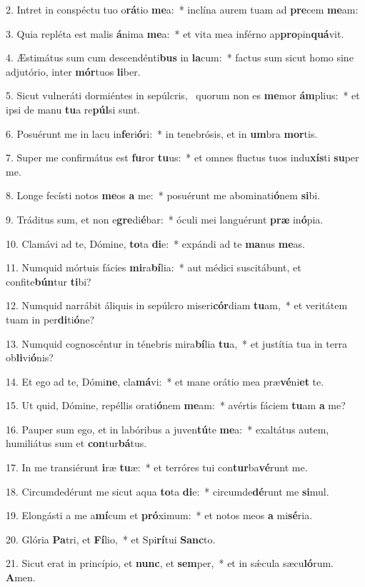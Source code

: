 2. Intret in conspéctu tuo o\textbf{rá}tio \textbf{me}a:~*  inclína aurem tuam ad \textbf{pre}cem \textbf{me}am:\

3. Quia repléta est malis \textbf{á}nima \textbf{me}a:~*  et vita mea inférno ap\textbf{pro}pin\textbf{quá}vit.\

4. Æstimátus sum cum descendénti\textbf{bus} in \textbf{la}cum:~*  factus sum sicut homo sine adjutório, inter \textbf{mór}tuos \textbf{li}ber.\

5. Sicut vulneráti dormiéntes in sepúlcris, \dag\  quorum non es \textbf{me}mor \textbf{ám}plius:~*  et ipsi de manu \textbf{tu}a re\textbf{púl}si sunt.\

6. Posuérunt me in lacu in\textbf{fe}ri\textbf{ó}ri:~*  in tenebrósis, et in \textbf{um}bra \textbf{mor}tis.\

7. Super me confirmátus est \textbf{fu}ror \textbf{tu}us:~*  et omnes fluctus tuos indu\textbf{xís}ti \textbf{su}per me.\

8. Longe fecísti notos \textbf{me}os \textbf{a} me:~*  posuérunt me abominati\textbf{ó}nem \textbf{si}bi.\

9. Tráditus sum, et non e\textbf{gre}di\textbf{é}bar:~*  óculi mei languérunt \textbf{præ} in\textbf{ó}pia.\

10. Clamávi ad te, Dómine, \textbf{to}ta \textbf{di}e:~*  expándi ad te \textbf{ma}nus \textbf{me}as.\

11. Numquid mórtuis fácies \textbf{mi}ra\textbf{bí}lia:~*  aut médici suscitábunt, et confite\textbf{bún}tur \textbf{ti}bi?\

12. Numquid narrábit áliquis in sepúlcro miseri\textbf{cór}diam \textbf{tu}am,~*  et veritátem tuam in per\textbf{di}ti\textbf{ó}ne?\

13. Numquid cognoscéntur in ténebris mira\textbf{bí}lia \textbf{tu}a,~*  et justítia tua in terra ob\textbf{li}vi\textbf{ó}nis?\

14. Et ego ad te, Dómi\textbf{ne}, cla\textbf{má}vi:~*  et mane orátio mea præ\textbf{vé}ni\textbf{et} te.\

15. Ut quid, Dómine, repéllis orati\textbf{ó}nem \textbf{me}am:~*  avértis fáciem \textbf{tu}am \textbf{a} me?\

16. Pauper sum ego, et in labóribus a juven\textbf{tú}te \textbf{me}a:~*  exaltátus autem, humiliátus sum et \textbf{con}tur\textbf{bá}tus.\

17. In me transiérunt \textbf{i}ræ \textbf{tu}æ:~*  et terróres tui con\textbf{tur}ba\textbf{vé}runt me.\

18. Circumdedérunt me sicut aqua \textbf{to}ta \textbf{di}e:~*  circumde\textbf{dé}runt me \textbf{si}mul.\

19. Elongásti a me a\textbf{mí}cum et \textbf{pró}ximum:~*  et notos meos \textbf{a} mi\textbf{sé}ria.\

20. Glória \textbf{Pa}tri, et \textbf{Fí}lio,~*  et Spi\textbf{rí}tui \textbf{Sanc}to.\

21. Sicut erat in princípio, et \textbf{nunc}, et \textbf{sem}per,~*  et in sǽcula sæcu\textbf{ló}rum. \textbf{A}men.\

